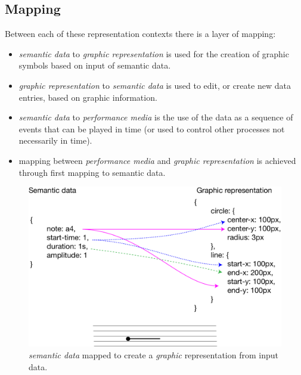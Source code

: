 \documentclass{article}
\begin{document}
\subsection{Mapping}\label{subsec:mapping}

Between each of these representation contexts there is a layer of mapping:

\begin{itemize}\itemsep0pt %
\item \textit{semantic data} to \textit{graphic representation} is used for the creation of graphic symbols based on input of semantic data.
\item \textit{graphic representation} to \textit{semantic data} is used to edit, or create new data entries, based on graphic information.
\item \textit{semantic data} to \textit{performance media} is the use of the data as a sequence of events that can be played in time (or used to control other processes not necessarily in time).
\item mapping between \textit{performance media} and \textit{graphic representation} is achieved through first mapping to semantic data.
\end{itemize}

\begin{figure}[ht!]
\includegraphics[width=1\columnwidth]{data-to-graphic.pdf}
\caption{\textit{semantic data} mapped to create a \textit{graphic} representation from input data.
\label{fig:data-to-graphic}}
\end{figure}
\end{document}
